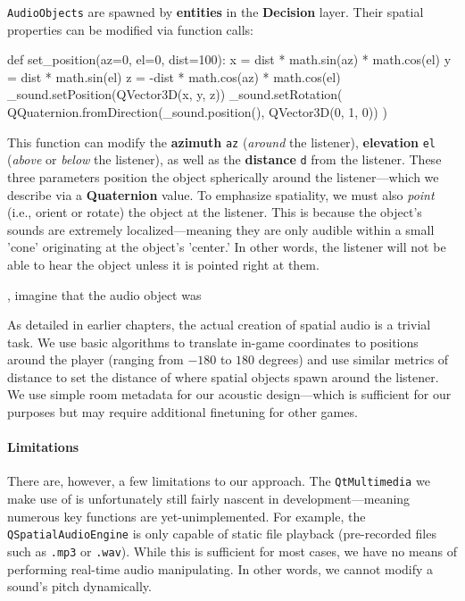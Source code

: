 \documentclass{report}
\newcommand{\state}[1]{\textbf{#1}}
\newcommand{\decision}{\textbf{Decision}\xspace}
\newcommand{\tech}[1]{\textbf{#1}}
\begin{document}
\texttt{AudioObjects} are spawned by \state{entities} in the \decision layer. Their spatial properties can be modified via function calls:

\begin{codeblock}
def set_position(az=0, el=0, dist=100):
    x = dist * math.sin(az) * math.cos(el)
    y = dist * math.sin(el)
    z = -dist * math.cos(az) * math.cos(el)
    _sound.setPosition(QVector3D(x, y, z))
    _sound.setRotation(
        QQuaternion.fromDirection(_sound.position(), QVector3D(0, 1, 0))
    )
\end{codeblock}

This function can modify the \tech{azimuth} \texttt{az} (\emph{around} the listener), \tech{elevation} \texttt{el} (\emph{above} or \emph{below} the listener), as well as the \tech{distance} \texttt{d} from the listener. These three parameters position the object spherically around the listener---which we describe via a \tech{Quaternion} value. To emphasize spatiality, we must also \emph{point} (i.e., orient or rotate) the object at the listener. This is because the object's sounds are extremely localized---meaning they are only audible within a small 'cone' originating at the object's 'center.' In other words, the listener will not be able to hear the object unless it is pointed right at them. 

, imagine that the audio object was

As detailed in earlier chapters, the actual creation of spatial audio is a trivial task. We use basic algorithms to translate in-game coordinates to positions around the player (ranging from $-180$ to $180$ degrees) and use similar metrics of distance to set the distance of where spatial objects spawn around the listener. We use simple room metadata for our acoustic design---which is sufficient for our purposes but may require additional finetuning for other games. 


\paragraph{Limitations}
There are, however, a few limitations to our approach. The \texttt{QtMultimedia} we make use of is unfortunately still fairly nascent in development---meaning numerous key functions are yet-unimplemented. For example, the \texttt{QSpatialAudioEngine} is only capable of static file playback (pre-recorded files such as \texttt{.mp3} or \texttt{.wav}). While this is sufficient for most cases, we have no means of performing real-time audio manipulating. In other words, we cannot modify a sound's pitch dynamically. 
\end{document}
